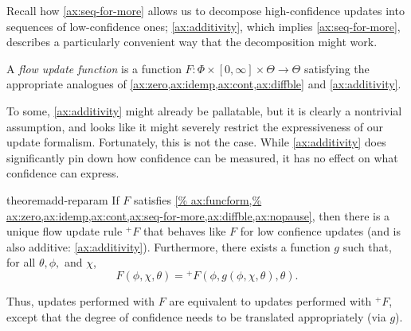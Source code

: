 Recall how \cref{ax:seq-for-more} allows us to decompose high-confidence updates into sequences of low-confidence ones;
\cref{ax:additivity},
which implies \cref{ax:seq-for-more}, describes a particularly convenient
way that the decomposition might work. 

\begin{defn}
	A \emph{flow update function}
	is a function
	$F : \Phi \times[0,\infty] \times \Theta\to \Theta$
	satisfying the appropriate analogues of
	\cref{ax:zero,ax:idemp,ax:cont,ax:diffble}
	and \cref{ax:additivity}.
\end{defn}

To some,
\cref{ax:additivity} might already be pallatable,
but it is clearly a nontrivial assumption, and looks like it might severely restrict the expressiveness of our update formalism.
Fortunately, this is not the case.
While \cref{ax:additivity} does significantly pin down how confidence 
can be measured, it has no effect on what confidence can express.  


\begin{linked}{theorem}{add-reparam}
	If $F$ satisfies \cref{%
		ax:funcform,%
		ax:zero,ax:idemp,ax:cont,ax:seq-for-more,ax:diffble,ax:nopause},
	then there is a unique 
	flow update rule
	 $^+\!F$
	that behaves like $F$ for low confience updates
	(and is also additive: \cref{ax:additivity}). 
	Furthermore, there exists a function 
	$g$ such that,
	for all $\theta,\phi,$ and $\chi$,
	\[
		F( \phi, 
			\chi,
		 \theta )
		 =
		{^+}\!F(\phi, 
		g(\phi,\chi,\theta),
		 \theta).
	\]
\end{linked}
Thus, updates performed with $F$ are equivalent
to updates performed with ${^+}\!F$, except that
the degree of confidence needs to be translated appropriately (via $g$).



